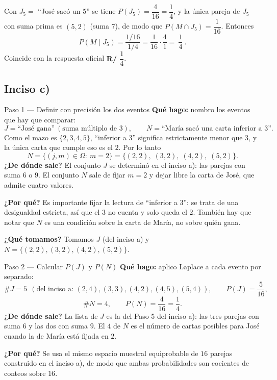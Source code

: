 \documentclass[11pt]{article}
\begin{document}
\begin{resp}
Con $J_5=$ ``José sacó un $5$'' se tiene $P(J_5)=\dfrac{4}{16}=\dfrac14$, y la única pareja de
$J_5$ con suma prima es $(5,2)$ (suma $7$), de modo que $P(M\cap J_5)=\dfrac{1}{16}$. Entonces
\[
P(M\mid J_5)=\frac{1/16}{1/4}=\frac{1}{16}\cdot\frac{4}{1}=\boxed{\ \frac{1}{4}\ }.
\]
Coincide con la respuesta oficial \textbf{R/ $\dfrac14$}.
\end{resp}

\subsection*{Inciso c)}

\begin{sol}
\begin{paso}{Paso 1 --- Definir con precisión los dos eventos}
\textbf{Qué hago:} nombro los eventos que hay que comparar:
\[
J=\text{``José gana''}\ (\text{suma múltiplo de }3),
\qquad
N=\text{``María sacó una carta inferior a 3''}.
\]
Como el mazo es $\{2,3,4,5\}$, ``inferior a $3$'' significa estrictamente menor que $3$, y la
única carta que cumple eso es el $2$. Por lo tanto
\[
N=\{(j,m)\in\Omega:\ m=2\}=\{(2,2),\;(3,2),\;(4,2),\;(5,2)\}.
\]
\textbf{¿De dónde sale?} El conjunto $J$ se determinó en el inciso a): las parejas con suma
$6$ o $9$. El conjunto $N$ sale de fijar $m=2$ y dejar libre la carta de José, que admite
cuatro valores.

\textbf{¿Por qué?} Es importante fijar la lectura de ``inferior a $3$'': se trata de una
desigualdad estricta, así que el $3$ no cuenta y solo queda el $2$. También hay que notar que
$N$ es una condición sobre la carta de María, no sobre quién gana.

\textbf{¿Qué tomamos?} Tomamos $J$ (del inciso a) y $N=\{(2,2),(3,2),(4,2),(5,2)\}$.
\end{paso}

\begin{paso}{Paso 2 --- Calcular $P(J)$ y $P(N)$}
\textbf{Qué hago:} aplico Laplace a cada evento por separado:
\[
\#J=5\ \ (\text{del inciso a: } (2,4),(3,3),(4,2),(4,5),(5,4)),
\qquad
P(J)=\frac{5}{16},
\]
\[
\#N=4,
\qquad
P(N)=\frac{4}{16}=\frac{1}{4}.
\]
\textbf{¿De dónde sale?} La lista de $J$ es la del Paso 5 del inciso a): las tres parejas con
suma $6$ y las dos con suma $9$. El $4$ de $N$ es el número de cartas posibles para José
cuando la de María está fijada en $2$.

\textbf{¿Por qué?} Se usa el mismo espacio muestral equiprobable de $16$ parejas construido en
el inciso a), de modo que ambas probabilidades son cocientes de conteos sobre $16$.


\end{paso}
\end{sol}
\end{document}
